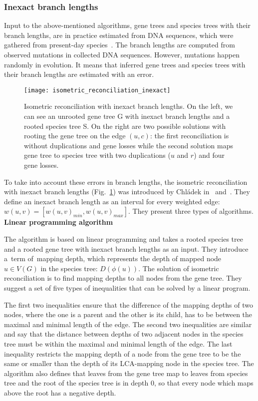 \subsubsection{Inexact branch lengths} \label{Inexact_branch_lengths}
Input to the above-mentioned algorithms, gene trees and species trees with their branch lengths, are in practice estimated from DNA sequences, which were gathered from present-day species~\cite{felsenstein}. The branch lengths are computed from observed mutations in collected DNA sequences. However, mutations happen randomly in evolution. It means that inferred gene trees and species trees with their branch lengths are estimated with an error.

\begin{figure}[ht!]
	\centering
	\label{isometric_reconciliation_inexact}
  	\texttt{[image: isometric\_reconciliation\_inexact]}
  	\caption[Isometric reconciliation with inexact branch lengths]{Isometric reconciliation with inexact branch lengths. On the left, we can see an unrooted gene tree G with inexact branch lengths and a rooted species tree S. On the right are two possible solutions with rooting the gene tree on the edge $(u, c)$: the first reconciliation is without duplications and gene losses while the second solution maps gene tree to species tree with two duplications ($u$ and $r$) and four gene losses.}
\end{figure}

To take into account these errors in branch lengths, the isometric reconciliation with inexact branch lengths (Fig.~\ref{isometric_reconciliation_inexact}) was introduced by Chládek in~\cite{chladek_unpublished} and~\cite{chladek_thesis}. They define an inexact branch length as an interval for every weighted edge: $w(u, v) = [ w(u, v)_{min}, w(u, v)_{max} ]$. They present three types of algorithms.\\
\textbf{Linear programming algorithm}

The algorithm is based on linear programming and takes a rooted species tree and a rooted gene tree with inexact branch lengths as an input. They introduce a~term of~mapping depth, which represents the depth of mapped node $u \in V(G)$ in the species tree: $D(\phi(u))$. The solution of isometric reconciliation is to find mapping depths to all nodes from the gene tree. They suggest a set of five types of inequalities that can be solved by a linear program.

The first two inequalities ensure that the difference of the mapping depths of two nodes, where the one is a parent and the other is its child, has to be between the maximal and minimal length of the edge. The second two inequalities are similar and say that the distance between depths of two adjacent nodes in the species tree must be within the maximal and minimal length of the edge. The last inequality restricts the mapping depth of a node from the gene tree to be the same or smaller than the depth of its LCA-mapping node in the species tree. The algorithm also defines that leaves from the gene tree map to leaves from species tree and the root of the species tree is in depth 0, so that every node which maps above the root has a negative depth. 


